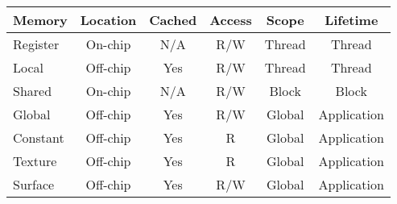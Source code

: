 \documentclass[a4paper,10pt,landscape]{article}
\makeatletter
\renewcommand{\subsection}{\@startsection{subsection}{2}{0mm}%
                                {-1explus -.5ex minus -.2ex}%
                                {0.5ex plus .2ex}%
                                {\normalfont\normalsize\bfseries}}
\makeatother
\begin{document}
\vfill

\tabcolsep 2.8pt
\begin{tabular}{l*{5}{c}}
\toprule
Memory & Location & Cached & Access & Scope & Lifetime \\
\midrule
Register & On-chip & N/A & R/W & Thread & Thread \\

Local & Off-chip & Yes & R/W & Thread & Thread \\

Shared & On-chip & N/A & R/W & Block & Block \\

Global & Off-chip & Yes & R/W & Global & Application \\

Constant & Off-chip & Yes & R & Global & Application \\

Texture & Off-chip & Yes & R & Global & Application \\

Surface & Off-chip & Yes & R/W & Global & Application \\
\bottomrule
\end{tabular}\\[.2em]



\end{document}
